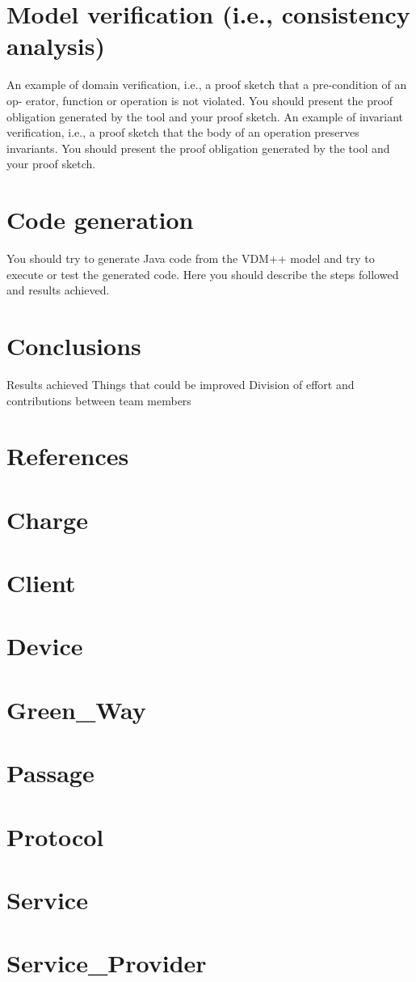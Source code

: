 \documentclass[a4paper]{article}
\begin{document}
\section{Model verification (i.e., consistency analysis)}
An example of domain verification, i.e., a proof sketch that a pre-condition of an op-
erator, function or operation is not violated. You 
should present the proof obligation 
generated by the tool and your proof sketch.  
An example of invariant verification, i.e., a proof sketch that the body of an operation 
preserves  invariants.  You  should  present  the  proof obligation  generated  by  the  tool 
and your proof sketch. 
\section{Code generation}
You should try to generate Java code from the VDM++ model and try to execute or test 
the generated code. Here you should describe the steps followed and results achieved. 
\section{Conclusions}
Results achieved  
Things that could be improved 
Division of effort and contributions between team members 
\section{References}
\section{Charge}

\section{Client}

\section{Device}

\section{Green\_Way}

\section{Passage}

\section{Protocol}

\section{Service}

\section{Service\_Provider}

\end{document}
